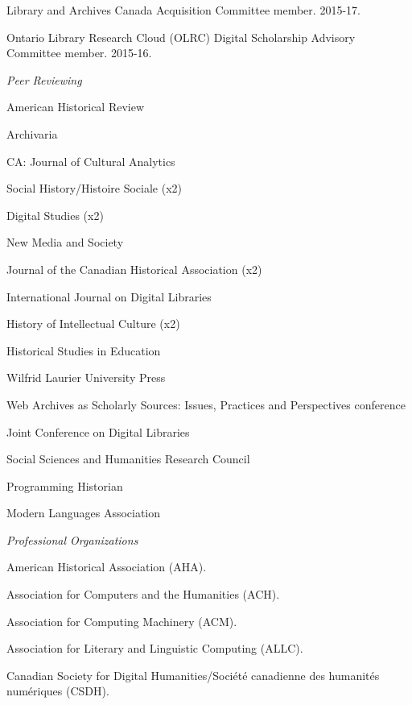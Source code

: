 \documentclass[11pt,article,oneside]{memoir}
\begin{document}
\ind Library and Archives Canada Acquisition Committee member. 2015-17.

\ind Ontario Library Research Cloud (OLRC) Digital Scholarship Advisory Committee member. 2015-16.

\medskip

\noindent\emph{Peer Reviewing \vspace{0.05in}}

\ind American Historical Review

\ind Archivaria

\ind CA: Journal of Cultural Analytics

\ind Social History/Histoire Sociale (x2)

\ind Digital Studies (x2)

\ind New Media and Society

\ind Journal of the Canadian Historical Association (x2)

\ind International Journal on Digital Libraries

\ind History of Intellectual Culture (x2)

\ind Historical Studies in Education

\ind Wilfrid Laurier University Press

\ind Web Archives as Scholarly Sources: Issues, Practices and Perspectives conference

\ind Joint Conference on Digital Libraries

\ind Social Sciences and Humanities Research Council

\ind Programming Historian

\ind Modern Languages Association

\medskip

\noindent\emph{Professional Organizations \vspace{0.05in}}

\ind American Historical Association (AHA).

\ind Association for Computers and the Humanities (ACH).

\ind Association for Computing Machinery (ACM).

\ind Association for Literary and Linguistic Computing (ALLC).

\ind Canadian Society for Digital Humanities/Soci\'et\'e canadienne des humanit\'es num\'eriques (CSDH).
\end{document}
